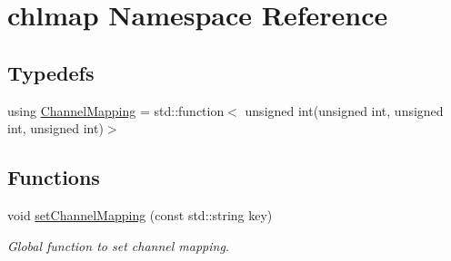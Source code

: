 \hypertarget{namespacechlmap}{}\section{chlmap Namespace Reference}
\label{namespacechlmap}
\subsection*{Typedefs}
\begin{DoxyCompactItemize}
\item 
using \hyperlink{namespacechlmap_aeed247fbd4770834005177ddb2712668}{Channel\+Mapping} = std\+::function$<$ unsigned int(unsigned int, unsigned int, unsigned int)$>$
\end{DoxyCompactItemize}
\subsection*{Functions}
\begin{DoxyCompactItemize}
\item 
void \hyperlink{namespacechlmap_a945bd413e64427712373da77277dd443}{set\+Channel\+Mapping} (const std\+::string key)
\begin{DoxyCompactList}\small\item\em Global function to set channel mapping. \end{DoxyCompactList}\end{DoxyCompactItemize}
